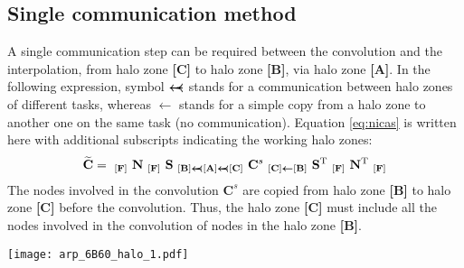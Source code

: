 \documentclass[12pt]{scrartcl}
\begin{document}
\subsection{Single communication method}
A single communication step can be required between the convolution and the interpolation, from halo zone \textbf{[C]} to halo zone \textbf{[B]}, via halo zone \textbf{[A]}. In the following expression, symbol $\mathrlap{\boldsymbol{\leftarrow}}\boldsymbol{\prec}$ stands for a communication between halo zones of different tasks, whereas $\boldsymbol{\leftarrow}$ stands for a simple copy from a halo zone to another one on the same task (no communication). Equation \ref{eq:nicas} is written here with additional subscripts indicating the working halo zones:
\begin{align}
\widetilde{\mathbf{C}} = \ _{\mathbf{[F]}} \ \mathbf{N} \ _{\mathbf{[F]}} \ \mathbf{S} \ _{\mathbf{[B]} \text{$\mathrlap{\boldsymbol{\leftarrow}}\boldsymbol{\prec}$} \mathbf{[A]} \text{$\mathrlap{\boldsymbol{\leftarrow}}\boldsymbol{\prec}$} \mathbf{[C]}} \ \mathbf{C}^s \ _{\mathbf{[C]} \boldsymbol{\leftarrow} \mathbf{[B]}} \ \mathbf{S}^{\mathrm{T}} \ _{\mathbf{[F]}} \ \mathbf{N}^{\mathrm{T}} \ _{\mathbf{[F]}}
\end{align}
The nodes involved in the convolution $\mathbf{C}^s$ are copied from halo zone \textbf{[B]} to halo zone \textbf{[C]} before the convolution. Thus, the halo zone \textbf{[C]} must include all the nodes involved in the convolution of nodes in the halo zone \textbf{[B]}.

\begin{center}
\texttt{[image: arp\_6B60\_halo\_1.pdf]}
\end{center}
\end{document}
